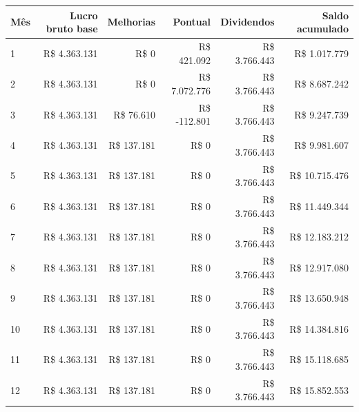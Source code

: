 \begin{tabular}{@{}p{}rrrrr@{}}
\toprule
\textbf{Mês} & \textbf{Lucro bruto base} & \textbf{Melhorias} & \textbf{Pontual} & \textbf{Dividendos} & \textbf{Saldo acumulado} \\
\midrule
1 & R\$ 4.363.131 & R\$ 0 & R\$ 421.092 & R\$ 3.766.443 & R\$ 1.017.779 \\
2 & R\$ 4.363.131 & R\$ 0 & R\$ 7.072.776 & R\$ 3.766.443 & R\$ 8.687.242 \\
3 & R\$ 4.363.131 & R\$ 76.610 & R\$ -112.801 & R\$ 3.766.443 & R\$ 9.247.739 \\
4 & R\$ 4.363.131 & R\$ 137.181 & R\$ 0 & R\$ 3.766.443 & R\$ 9.981.607 \\
5 & R\$ 4.363.131 & R\$ 137.181 & R\$ 0 & R\$ 3.766.443 & R\$ 10.715.476 \\
6 & R\$ 4.363.131 & R\$ 137.181 & R\$ 0 & R\$ 3.766.443 & R\$ 11.449.344 \\
7 & R\$ 4.363.131 & R\$ 137.181 & R\$ 0 & R\$ 3.766.443 & R\$ 12.183.212 \\
8 & R\$ 4.363.131 & R\$ 137.181 & R\$ 0 & R\$ 3.766.443 & R\$ 12.917.080 \\
9 & R\$ 4.363.131 & R\$ 137.181 & R\$ 0 & R\$ 3.766.443 & R\$ 13.650.948 \\
10 & R\$ 4.363.131 & R\$ 137.181 & R\$ 0 & R\$ 3.766.443 & R\$ 14.384.816 \\
11 & R\$ 4.363.131 & R\$ 137.181 & R\$ 0 & R\$ 3.766.443 & R\$ 15.118.685 \\
12 & R\$ 4.363.131 & R\$ 137.181 & R\$ 0 & R\$ 3.766.443 & R\$ 15.852.553 \\
\bottomrule
\end{tabular}
